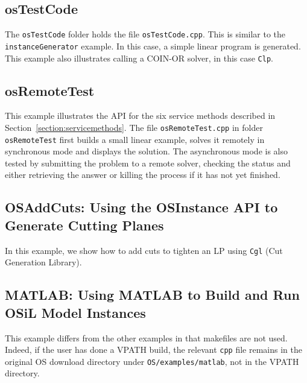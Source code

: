 \documentclass[11pt]{article}
\renewcommand{\_}{{\char"5F}}
\renewcommand{\{}{{\char"7B}}
\renewcommand{\}}{{\char"7D}}
\renewcommand{\^}{{\char"0D}}
\renewcommand{\'}{{\char"0D}}
\begin{document}
\begin{enumerate}[Step 1:]
\subsection{osTestCode}\label{section:exampleOSTestCode}

The {\tt osTestCode} folder holds the file {\tt osTestCode.cpp}. This is similar to the {\tt instanceGenerator} example.
In this case, a simple linear program is generated. This example also illustrates calling a COIN-OR solver,
in this case {\tt Clp}.

\subsection{osRemoteTest}\label{section:exampleOSRemoteTest}

This example illustrates the API for the six service methods described in Section~\ref{section:servicemethods}.
The file {\tt osRemoteTest.cpp} in folder {\tt osRemoteTest} first builds a small linear
example, solves it remotely in synchronous mode and displays the solution.
The asynchronous mode is also tested by submitting the problem to a remote solver,
checking the status and either retrieving the answer or killing the process if it has not
yet finished.

\subsection{OSAddCuts: Using the OSInstance API to Generate Cutting Planes}\label{section:exampleOSAddCuts}

In this example, we show how to add cuts to tighten an LP using {\tt Cgl} (Cut Generation Library).



\subsection{MATLAB:  Using MATLAB to Build and Run OSiL Model Instances}\label{section:usingmatlab}

This example differs from the other examples in that makefiles are not used.
Indeed, if the user has done a VPATH build, the relevant {\tt cpp} file remains
in the original OS download directory under {\tt OS/examples/matlab},
not in the VPATH directory.





\end{enumerate}
\end{document}
